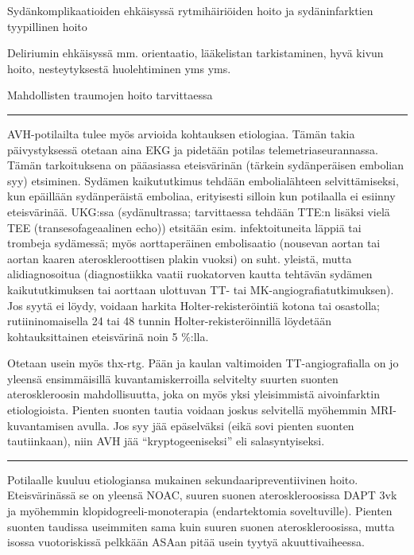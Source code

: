 \documentclass[
]{book}
\begin{document}
Sydänkomplikaatioiden ehkäisyssä rytmihäiriöiden hoito ja sydäninfarktien tyypillinen hoito

Deliriumin ehkäisyssä mm. orientaatio, lääkelistan tarkistaminen, hyvä kivun hoito, nesteytyksestä huolehtiminen yms yms.

Mahdollisten traumojen hoito tarvittaessa

\begin{center}\rule{0.5\linewidth}{0.5pt}\end{center}

AVH-potilailta tulee myös arvioida kohtauksen etiologiaa. Tämän takia päivystyksessä otetaan aina EKG ja pidetään potilas telemetriaseurannassa. Tämän tarkoituksena on pääasiassa eteisvärinän (tärkein sydänperäisen embolian syy) etsiminen. Sydämen kaikututkimus tehdään embolialähteen selvittämiseksi, kun epäillään sydänperäistä emboliaa, erityisesti silloin kun potilaalla ei esiinny eteisvärinää. UKG:ssa (sydänultrassa; tarvittaessa tehdään TTE:n lisäksi vielä TEE (transesofageaalinen echo)) etsitään esim. infektoituneita läppiä tai trombeja sydämessä; myös aorttaperäinen embolisaatio (nousevan aortan tai aortan kaaren ateroskleroottisen plakin vuoksi) on suht. yleistä, mutta alidiagnosoitua (diagnostiikka vaatii ruokatorven kautta tehtävän sydämen kaikututkimuksen tai aorttaan ulottuvan TT- tai MK-angiografiatutkimuksen). Jos syytä ei löydy, voidaan harkita Holter-rekisteröintiä kotona tai osastolla; rutiininomaisella 24 tai 48 tunnin Holter-rekisteröinnillä löydetään kohtauksittainen eteisvärinä noin 5 \%:lla.

Otetaan usein myös thx-rtg. Pään ja kaulan valtimoiden TT-angiografialla on jo yleensä ensimmäisillä kuvantamiskerroilla selvitelty suurten suonten ateroskleroosin mahdollisuutta, joka on myös yksi yleisimmistä aivoinfarktin etiologioista. Pienten suonten tautia voidaan joskus selvitellä myöhemmin MRI-kuvantamisen avulla. Jos syy jää epäselväksi (eikä sovi pienten suonten tautiinkaan), niin AVH jää ``kryptogeeniseksi'' eli salasyntyiseksi.

\begin{center}\rule{0.5\linewidth}{0.5pt}\end{center}

Potilaalle kuuluu etiologiansa mukainen sekundaaripreventiivinen hoito. Eteisvärinässä se on yleensä NOAC, suuren suonen ateroskleroosissa DAPT 3vk ja myöhemmin klopidogreeli-monoterapia (endartektomia soveltuville). Pienten suonten taudissa useimmiten sama kuin suuren suonen ateroskleroosissa, mutta isossa vuotoriskissä pelkkään ASAan pitää usein tyytyä akuuttivaiheessa.
\end{document}
